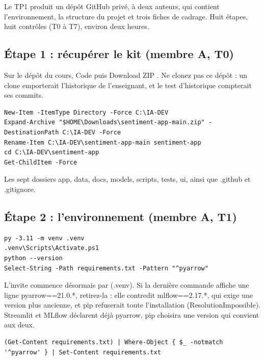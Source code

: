 \documentclass[11pt,a4paper]{article}
\newcommand{\co}[1]{{\ttfamily\hyphenchar\font=45\relax #1}}
\begin{document}
Le TP1 produit un dépôt GitHub privé, à deux auteurs, qui contient l'environnement, la structure du projet et
trois fiches de cadrage. Huit étapes, huit contrôles (T0 à T7), environ deux heures.

\subsection{Étape 1 : récupérer le kit (membre A, T0)}

Sur le dépôt du cours, \og Code \fg{} puis \og Download ZIP \fg{}. Ne clonez pas ce dépôt : un clone
emporterait l'historique de l'enseignant, et le test d'historique compterait ses commits.

\begin{lstlisting}
New-Item -ItemType Directory -Force C:\IA-DEV
Expand-Archive "$HOME\Downloads\sentiment-app-main.zip" -DestinationPath C:\IA-DEV -Force
Rename-Item C:\IA-DEV\sentiment-app-main sentiment-app
cd C:\IA-DEV\sentiment-app
Get-ChildItem -Force
\end{lstlisting}

\begin{attendu}
Les sept dossiers \co{app}, \co{data}, \co{docs}, \co{models}, \co{scripts}, \co{tests}, \co{ui}, ainsi que
\co{.github} et \co{.gitignore}.
\end{attendu}

\subsection{Étape 2 : l'environnement (membre A, T1)}

\begin{lstlisting}
py -3.11 -m venv .venv
.venv\Scripts\Activate.ps1
python --version
Select-String -Path requirements.txt -Pattern "^pyarrow"
\end{lstlisting}

L'invite commence désormais par \co{(.venv)}. Si la dernière commande affiche une ligne
\co{pyarrow==21.0.*}, retirez-la : elle contredit \co{mlflow==2.17.*}, qui exige une version plus ancienne,
et pip refuserait toute l'installation (\co{ResolutionImpossible}). Streamlit et MLflow déclarent déjà
pyarrow, pip choisira une version qui convient aux deux.

\begin{lstlisting}
(Get-Content requirements.txt) | Where-Object { $_ -notmatch '^pyarrow' } | Set-Content requirements.txt
\end{lstlisting}
\end{document}
